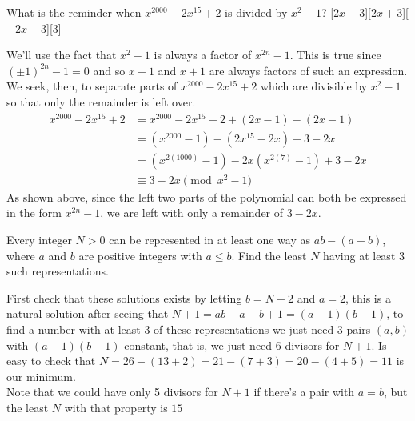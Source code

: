 \documentclass[12pt]{article}
\newcounter{problem}
\begin{document}
\begin{problem}
   What is the reminder when $x^{2000}-2x^{15}+2$ is divided by $x^2-1$?
   [$2x-3$][$2x+3$][$-2x-3$][3]
\end{problem}

\begin{solution}[A]
   We'll use the fact that $x^{2}-1$ is always a factor of $x^{2n}-1$. This is true since $(\pm1)^{2n}-1=0$ and so $x-1$ and $x+1$ are always factors of such an expression. We seek, then, to separate parts of $x^{2000}-2x^{15}+2$ which are divisible by $x^{2}-1$ so that only the remainder is left over.
    \begin{align*}
        x^{2000}-2x^{15}+2 &= x^{2000} - 2x^{15} +2 + (2x - 1) - (2x - 1)\\
        &= (x^{2000} - 1) - (2x^{15} - 2x) + 3 - 2x\\
        &= (x^{2(1000)} - 1) - 2x(x^{2(7)} - 1) + 3 - 2x\\
        &\equiv 3 - 2x \pmod{x^2-1}
    \end{align*}
    As shown above, since the left two parts of the polynomial can both be expressed in the form $x^{2n}-1$, we are left with only a remainder of $\boxed{3-2x}$.

\end{solution}


\begin{problem}
   Every integer $N > 0$ can be represented in at least one way as $ab - (a + b)$, where $a$ and $b$ are positive integers with $a \leq b$. Find the least $N$ having at least 3 such representations.%
\end{problem}

\begin{solution}[12]
   First check that these solutions exists by letting $b=N+2$ and $a=2$, this is a natural solution after seeing that $N+1=ab-a-b+1=(a-1)(b-1)$, to find a number with at least 3 of these representations we just need 3 pairs $(a,b)$ with $(a-1)(b-1)$ constant, that is, we just need 6 divisors for $N+1$. Is easy to check that $N=26-(13+2)=21-(7+3)=20-(4+5)=\boxed{11}$ is our minimum.\\
    Note that we could have only 5 divisors for $N+1$ if there's a pair with $a=b$, but the least $N$ with that property is $15$
\end{solution}
\end{document}
